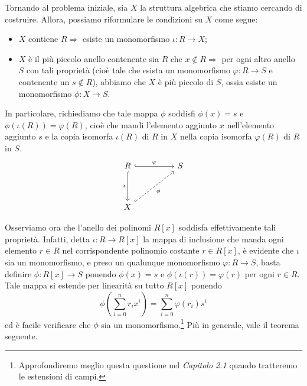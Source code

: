 \documentclass{article}
\theoremstyle{definition}
\begin{document}
\noindent Tornando al problema iniziale, sia $X$ la struttura algebrica che stiamo cercando di costruire. Allora, possiamo riformulare le condizioni su $X$ come segue:
\begin{itemize}
\item $X$ contiene $R\Rightarrow$ esiste un monomorfismo $\iota\colon R\to X$;
\item $X$ è il più piccolo anello contenente sia $R$ che $x\notin R\Rightarrow$ per ogni altro anello $S$ con tali proprietà (cioè tale che esista un monomorfismo $\varphi\colon R\to S$ e contenente un $s\notin R$), abbiamo che $X$ è più piccolo di $S$, ossia esiste un monomorfismo $\phi\colon X\to S$. 
\end{itemize}In particolare, richiediamo che tale mappa $\phi$ soddisfi $\phi(x)=s$ e $\phi(\iota(R))=\varphi(R)$, cioè che mandi l'elemento aggiunto $x$ nell'elemento aggiunto $s$ e la copia isomorfa $\iota(R)$ di $R$ in $X$ nella copia isomorfa $\varphi(R)$ di $R$ in $S$.
\[
\begin{tikzcd}
R \arrow[rr, "\varphi", hook] \arrow[dd, "\iota"', hook] &  & S \\
                                                         &  &   \\
X \arrow[rruu, "\phi"', dashed, hook]                    &  &  
\end{tikzcd}
\]

\noindent Osserviamo ora che l'anello dei polinomi $R[x]$ soddisfa effettivamente tali proprietà. Infatti, detta $\iota\colon R\to R[x]$ la mappa di inclusione che manda ogni elemento $r\in R$ nel corrispondente polinomio costante $r\in R[x]$, è evidente che $\iota$ sia un monomorfismo, e preso un qualunque monomorfismo $\varphi\colon R\to S$, basta definire $\phi\colon R[x]\to S$ ponendo $\phi(x)=s$ e $\phi(\iota(r))=\varphi(r)$ per ogni $r\in R$. Tale mappa si estende per linearità su tutto $R[x]$ ponendo $$\phi\left( \sum\limits_{i=0}^n r_ix^i \right)=\sum\limits_{i=0}^n \varphi(r_i)s^i$$ ed è facile verificare che $\phi$ sia un monomorfismo.\footnote{Approfondiremo meglio questa questione nel \emph{Capitolo 2.1} quando tratteremo le estensioni di campi.} Più in generale, vale il teorema seguente.
\end{document}
